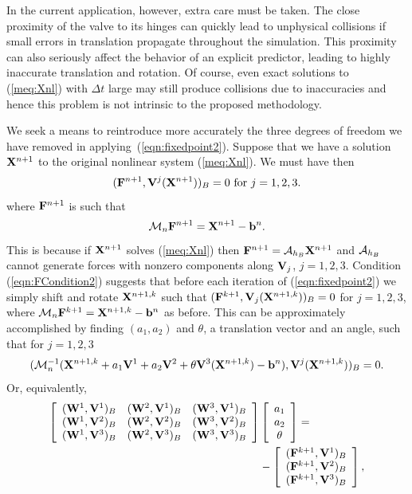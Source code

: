 In the current application, however, extra care must be taken. The close proximity of the valve to its hinges can quickly lead to unphysical collisions  if small errors in translation propagate throughout the simulation. 
This proximity can also seriously affect the behavior of an explicit predictor, leading to highly inaccurate translation and rotation.
Of course, even exact solutions to (\ref{meq:Xnl}) with $\Delta t$ large may still produce collisions due to inaccuracies and hence
this problem is not intrinsic to the proposed methodology. 

We seek a means to reintroduce more accurately the three degrees of freedom we have removed in applying~(\ref{eqn:fixedpoint2}).
Suppose that we have a solution $\mathbf{X}^{n+1}$ to the original nonlinear system (\ref{meq:Xnl}). We must have then
\begin{equation}
( \mathbf{F}^{n+1}, \mathbf{V}^j(\mathbf{X}^{n+1}) )_B = 0
\textrm{ for } j=1,2,3.
\label{eqn:FCondition2}
\end{equation}
where $\mathbf{F}^{n+1}$ is such that 
\begin{equation}
\mathcal{M}_n\mathbf{F}^{n+1}=\mathbf{X}^{n+1}-\mathbf{b}^n.
\end{equation}
This is because if $\mathbf{X}^{n+1}$ solves (\ref{meq:Xnl}) then $\mathbf{F}^{n+1} = \mathcal{A}_{h_B}\mathbf{X}^{n+1}$ and $\mathcal{A}_{h_B}$ cannot generate forces with nonzero components along $\mathbf{V}_j$, $j=1,2,3$.
Condition (\ref{eqn:FCondition2}) suggests that before each iteration of (\ref{eqn:fixedpoint2}) we simply shift and rotate $\mathbf{X}^{n+1,k}$ such that 
$( \mathbf{F}^{k+1}, \mathbf{V}_j(\mathbf{X}^{n+1,k}) )_B = 0$ for $j=1,2,3$, where $\mathcal{M}_n\mathbf{F}^{k+1}=\mathbf{X}^{n+1,k}-\mathbf{b}^n$ as before. This can be approximately accomplished by finding $(a_1,a_2)$ and $\theta$, a translation vector and an angle, such that for $j=1,2,3$
\begin{equation}
( \mathcal{M}_n^{-1}(\mathbf{X}^{n+1,k}+a_1\mathbf{V}^1+a_2\mathbf{V}^2+\theta\mathbf{V}^3(\mathbf{X}^{n+1,k})-\mathbf{b}^n),  \mathbf{V}^j(\mathbf{X}^{n+1,k}) )_B = 0.
\label{eqn:ProjFree}
\end{equation}
Or, equivalently,
\begin{equation}
\begin{split}
\left[ \begin{array}{ccc}
(\mathbf{W}^1,\mathbf{V}^1)_B &
(\mathbf{W}^2,\mathbf{V}^1)_B &
(\mathbf{W}^3,\mathbf{V}^1)_B \\
(\mathbf{W}^1,\mathbf{V}^2)_B &
(\mathbf{W}^2,\mathbf{V}^2)_B &
(\mathbf{W}^3,\mathbf{V}^2)_B \\
(\mathbf{W}^1,\mathbf{V}^3)_B &
(\mathbf{W}^2,\mathbf{V}^3)_B &
(\mathbf{W}^3,\mathbf{V}^3)_B \\ 
\end{array} \right] &
\left[ \begin{array}{c}
a_1 \\ a_2 \\ \theta
\end{array} \right]
= \\
&-\left[ \begin{array}{c}
(\mathbf{F}^{k+1},\mathbf{V}^1)_B \\
(\mathbf{F}^{k+1},\mathbf{V}^2)_B \\
(\mathbf{F}^{k+1},\mathbf{V}^3)_B \\
\end{array} \right],
\end{split}
\end{equation}
